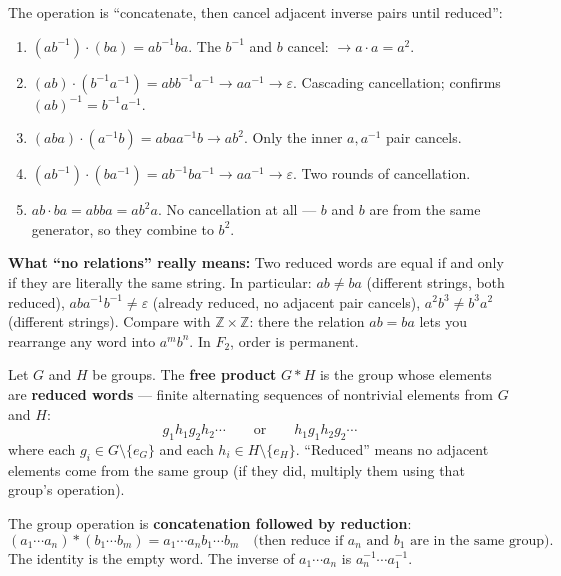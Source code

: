 \documentclass[11pt]{report}
\begin{document}
\begin{exbox}[Multiplication in $F_2$]
The operation is ``concatenate, then cancel adjacent inverse pairs until reduced'':
\begin{enumerate}[nosep]
    \item $(ab^{-1}) \cdot (ba) = ab^{-1}ba$. The $b^{-1}$ and $b$ cancel: $\to a \cdot a = a^2$.
    \item $(ab) \cdot (b^{-1}a^{-1}) = abb^{-1}a^{-1} \to aa^{-1} \to \varepsilon$. Cascading cancellation; confirms $(ab)^{-1} = b^{-1}a^{-1}$.
    \item $(aba) \cdot (a^{-1}b) = abaa^{-1}b \to ab^2$. Only the inner $a, a^{-1}$ pair cancels.
    \item $(ab^{-1}) \cdot (ba^{-1}) = ab^{-1}ba^{-1} \to aa^{-1} \to \varepsilon$. Two rounds of cancellation.
    \item $ab \cdot ba = abba = ab^2a$. No cancellation at all --- $b$ and $b$ are from the same generator, so they combine to $b^2$.
\end{enumerate}

\textbf{What ``no relations'' really means:} Two reduced words are equal if and only if they are literally the same string. In particular: $ab \neq ba$ (different strings, both reduced), $aba^{-1}b^{-1} \neq \varepsilon$ (already reduced, no adjacent pair cancels), $a^2b^3 \neq b^3a^2$ (different strings). Compare with $\mathbb{Z} \times \mathbb{Z}$: there the relation $ab = ba$ lets you rearrange any word into $a^m b^n$. In $F_2$, order is permanent.
\end{exbox}

\begin{defbox}
Let $G$ and $H$ be groups. The \textbf{free product} $G * H$ is the group whose elements are \textbf{reduced words} --- finite alternating sequences of nontrivial elements from $G$ and $H$:
\[g_1 h_1 g_2 h_2 \cdots \qquad \text{or} \qquad h_1 g_1 h_2 g_2 \cdots\]
where each $g_i \in G \setminus \{e_G\}$ and each $h_i \in H \setminus \{e_H\}$. ``Reduced'' means no adjacent elements come from the same group (if they did, multiply them using that group's operation).

The group operation is \textbf{concatenation followed by reduction}:
\[(a_1 \cdots a_n) * (b_1 \cdots b_m) = a_1 \cdots a_n b_1 \cdots b_m \quad \text{(then reduce if $a_n$ and $b_1$ are in the same group)}.\]
The identity is the empty word. The inverse of $a_1 \cdots a_n$ is $a_n^{-1} \cdots a_1^{-1}$.
\end{defbox}
\end{document}
